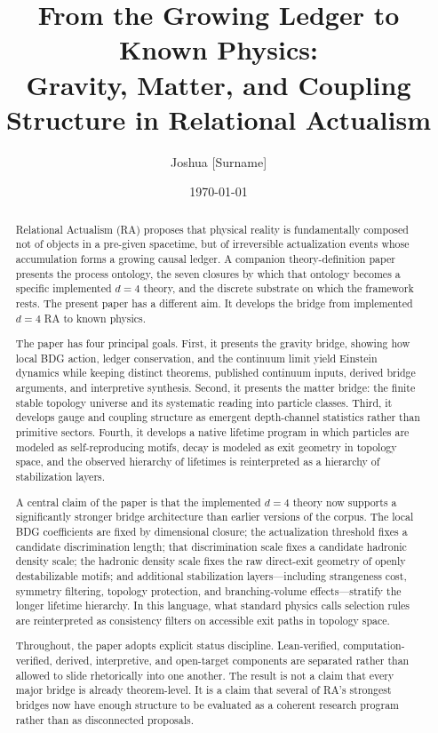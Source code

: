 \documentclass[11pt]{article}
\title{From the Growing Ledger to Known Physics: \\ Gravity, Matter, and Coupling Structure in Relational Actualism}
\author{Joshua [Surname]}
\date{\today}
\begin{document}
\maketitle

\begin{abstract}
Relational Actualism (RA) proposes that physical reality is fundamentally composed not of objects in a pre-given spacetime, but of irreversible actualization events whose accumulation forms a growing causal ledger. A companion theory-definition paper presents the process ontology, the seven closures by which that ontology becomes a specific implemented $d=4$ theory, and the discrete substrate on which the framework rests. The present paper has a different aim. It develops the bridge from implemented $d=4$ RA to known physics.

The paper has four principal goals. First, it presents the gravity bridge, showing how local BDG action, ledger conservation, and the continuum limit yield Einstein dynamics while keeping distinct theorems, published continuum inputs, derived bridge arguments, and interpretive synthesis. Second, it presents the matter bridge: the finite stable topology universe and its systematic reading into particle classes. Third, it develops gauge and coupling structure as emergent depth-channel statistics rather than primitive sectors. Fourth, it develops a native lifetime program in which particles are modeled as self-reproducing motifs, decay is modeled as exit geometry in topology space, and the observed hierarchy of lifetimes is reinterpreted as a hierarchy of stabilization layers.

A central claim of the paper is that the implemented $d=4$ theory now supports a significantly stronger bridge architecture than earlier versions of the corpus. The local BDG coefficients are fixed by dimensional closure; the actualization threshold fixes a candidate discrimination length; that discrimination scale fixes a candidate hadronic density scale; the hadronic density scale fixes the raw direct-exit geometry of openly destabilizable motifs; and additional stabilization layers---including strangeness cost, symmetry filtering, topology protection, and branching-volume effects---stratify the longer lifetime hierarchy. In this language, what standard physics calls selection rules are reinterpreted as consistency filters on accessible exit paths in topology space.

Throughout, the paper adopts explicit status discipline. Lean-verified, computation-verified, derived, interpretive, and open-target components are separated rather than allowed to slide rhetorically into one another. The result is not a claim that every major bridge is already theorem-level. It is a claim that several of RA's strongest bridges now have enough structure to be evaluated as a coherent research program rather than as disconnected proposals.
\end{abstract}
\end{document}
